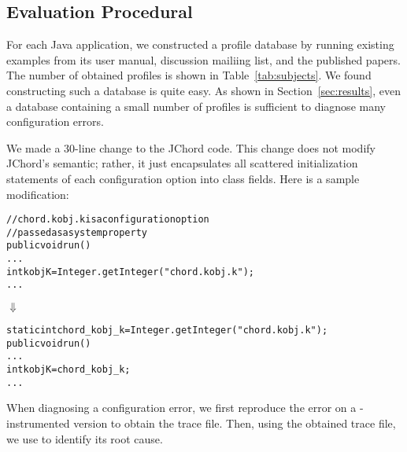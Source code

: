 \subsection{Evaluation Procedural}

For each Java application, we constructed a profile database
by running existing examples from its user manual, discussion
mailiing list, and the published papers. The number of obtained
 profiles is shown in Table~\ref{tab:subjects}. We
found constructing such a database is quite easy. As shown
in Section~\ref{sec:results}, even a database containing
a small number of profiles is sufficient to
diagnose many configuration errors.


We made a 30-line change to the JChord code. This change
does not modify JChord's semantic; rather, it just encapsulates
all scattered initialization statements of each configuration option
into class fields. Here is a sample modification:



\begin{CodeOut}
\begin{alltt}
   // chord.kobj.k is a configuration option
   // passed as a system property
   public void run() \ttlcb
     ...
     int kobjK = Integer.getInteger("chord.kobj.k");
     ...
   \ttrcb
\end{alltt}
\end{CodeOut}
\vspace{-4mm}
\hspace{20mm}$\Downarrow$ 
\begin{CodeOut}
\begin{alltt}
   static int chord\_kobj\_k = Integer.getInteger("chord.kobj.k");
   public void run() \ttlcb
     ...
     int kobjK = chord\_kobj\_k; 
     ...
   \ttrcb
\end{alltt}
\end{CodeOut}






When diagnosing a configuration error, we first reproduce the
error on a \ourtool-instrumented version to obtain the
trace file. Then, using the obtained trace file, we use \ourtool
to identify its root cause.

